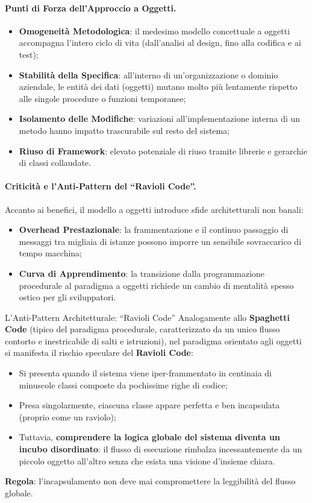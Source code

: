 \documentclass[12pt]{extarticle}
\begin{document}
\paragraph{Punti di Forza dell'Approccio a Oggetti.}
\begin{itemize}
    \item \textbf{Omogeneità Metodologica}: il medesimo modello concettuale a oggetti accompagna l'intero ciclo di vita (dall'analisi al design, fino alla codifica e ai test);
    \item \textbf{Stabilità della Specifica}: all'interno di un'organizzazione o dominio aziendale, le entità dei dati (oggetti) mutano molto più lentamente rispetto alle singole procedure o funzioni temporanee;
    \item \textbf{Isolamento delle Modifiche}: variazioni all'implementazione interna di un metodo hanno impatto trascurabile sul resto del sistema;
    \item \textbf{Riuso di Framework}: elevato potenziale di riuso tramite librerie e gerarchie di classi collaudate.
\end{itemize}

\paragraph{Criticità e l'Anti-Pattern del ``Ravioli Code''.}
Accanto ai benefici, il modello a oggetti introduce sfide architetturali non banali:
\begin{itemize}
    \item \textbf{Overhead Prestazionale}: la frammentazione e il continuo passaggio di messaggi tra migliaia di istanze possono imporre un sensibile sovraccarico di tempo macchina;
    \item \textbf{Curva di Apprendimento}: la transizione dalla programmazione procedurale al paradigma a oggetti richiede un cambio di mentalità spesso ostico per gli sviluppatori.
\end{itemize}

\begin{cbox}{L'Anti-Pattern Architetturale: ``Ravioli Code''}
\noindent Analogamente allo \textbf{Spaghetti Code} (tipico del paradigma procedurale, caratterizzato da un unico flusso contorto e inestricabile di salti e istruzioni), nel paradigma orientato agli oggetti si manifesta il rischio speculare del \textbf{Ravioli Code}:
\begin{itemize}
    \item Si presenta quando il sistema viene iper-frammentato in centinaia di minuscole classi composte da pochissime righe di codice;
    \item Presa singolarmente, ciascuna classe appare perfetta e ben incapsulata (proprio come un raviolo);
    \item Tuttavia, \textbf{comprendere la logica globale del sistema diventa un incubo disordinato}: il flusso di esecuzione rimbalza incessantemente da un piccolo oggetto all'altro senza che esista una visione d'insieme chiara.
\end{itemize}
\textbf{Regola}: l'incapsulamento non deve mai compromettere la leggibilità del flusso globale.
\end{cbox}
\end{document}
